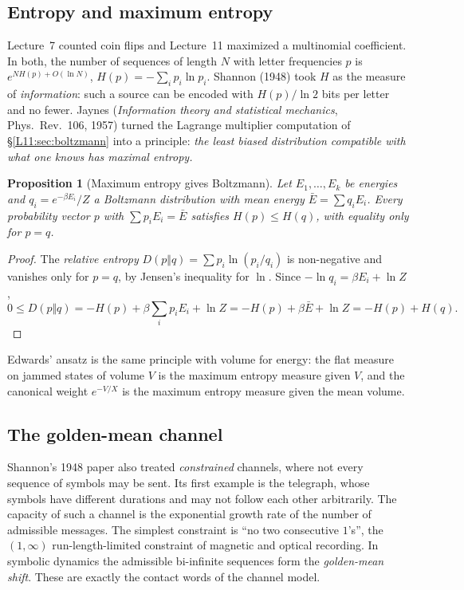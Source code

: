 \documentclass[11pt,openany]{book}
\theoremstyle{plain}
\newtheorem{proposition}[theorem]{Proposition}
\theoremstyle{definition}
\theoremstyle{remark}
\begin{document}
\subsection{Entropy and maximum entropy}

Lecture~7 counted coin flips and Lecture~11 maximized a multinomial coefficient. In both, the number of
sequences of length $N$ with letter frequencies $p$ is $e^{NH(p)+O(\ln N)}$, $H(p)=-\sum_ip_i\ln p_i$.
Shannon (1948) took $H$ as the measure of \emph{information}: such a source can be encoded with
$H(p)/\ln2$ bits per letter and no fewer. Jaynes (\emph{Information theory and statistical mechanics},
Phys.\ Rev.~106, 1957) turned the Lagrange multiplier computation of \S\ref{L11:sec:boltzmann} into a
principle: \emph{the least biased distribution compatible with what one knows has maximal entropy.}

\begin{proposition}[Maximum entropy gives Boltzmann]\label{SM:prop:jaynes}
Let $E_1,\dots,E_k$ be energies and $q_i=e^{-\beta E_i}/Z$ a Boltzmann distribution with mean energy
$\bar E=\sum q_iE_i$. Every probability vector $p$ with $\sum p_iE_i=\bar E$ satisfies $H(p)\le H(q)$, with
equality only for $p=q$.
\end{proposition}

\begin{proof}
The \emph{relative entropy} $D(p\Vert q)=\sum p_i\ln(p_i/q_i)$ is non-negative and vanishes only for $p=q$,
by Jensen's inequality for $\ln$. Since $-\ln q_i=\beta E_i+\ln Z$,
\[
  0\le D(p\Vert q)=-H(p)+\beta\sum_ip_iE_i+\ln Z=-H(p)+\beta\bar E+\ln Z=-H(p)+H(q).
\]
\end{proof}

Edwards' ansatz is the same principle with volume for energy: the flat measure on jammed states of
volume $V$ is the maximum entropy measure given $V$, and the canonical weight $e^{-V/X}$ is the maximum
entropy measure given the mean volume.

\subsection{The golden-mean channel}

Shannon's 1948 paper also treated \emph{constrained} channels, where not every sequence of symbols may be
sent. Its first example is the telegraph, whose symbols have different durations and may not follow each
other arbitrarily. The capacity of such a channel is the exponential growth rate of the number of
admissible messages. The simplest constraint is ``no two consecutive $1$'s'', the $(1,\infty)$
run-length-limited constraint of magnetic and optical recording. In symbolic dynamics the admissible
bi-infinite sequences form the \emph{golden-mean shift}. These are exactly the contact words of the
channel model.
\end{document}
